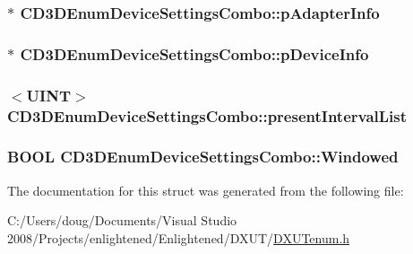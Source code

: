 \label{struct_c_d3_d_enum_device_settings_combo_a55cd4a9f4fe26882fb88ac5f6e97487b}
\hypertarget{struct_c_d3_d_enum_device_settings_combo_aa19ba203763b89e601bca6b9b63c4664}{
\subsubsection[{pAdapterInfo}]{$\ast$ {\bf CD3DEnumDeviceSettingsCombo::pAdapterInfo}}}
\label{struct_c_d3_d_enum_device_settings_combo_aa19ba203763b89e601bca6b9b63c4664}
\hypertarget{struct_c_d3_d_enum_device_settings_combo_a8d7ac13c75c72aa1f1f43c9b64d2988a}{
\subsubsection[{pDeviceInfo}]{$\ast$ {\bf CD3DEnumDeviceSettingsCombo::pDeviceInfo}}}
\label{struct_c_d3_d_enum_device_settings_combo_a8d7ac13c75c72aa1f1f43c9b64d2988a}
\hypertarget{struct_c_d3_d_enum_device_settings_combo_a2837c6202c73f23f560c0a5f641a111f}{
\subsubsection[{presentIntervalList}]{$<$UINT$>$ {\bf CD3DEnumDeviceSettingsCombo::presentIntervalList}}}
\label{struct_c_d3_d_enum_device_settings_combo_a2837c6202c73f23f560c0a5f641a111f}
\hypertarget{struct_c_d3_d_enum_device_settings_combo_a1117df7df25ceaa63f497664f6ba98d1}{
\subsubsection[{Windowed}]{\setlength{\rightskip}{0pt plus 5cm}BOOL {\bf CD3DEnumDeviceSettingsCombo::Windowed}}}
\label{struct_c_d3_d_enum_device_settings_combo_a1117df7df25ceaa63f497664f6ba98d1}


The documentation for this struct was generated from the following file:\begin{DoxyCompactItemize}
\item 
C:/Users/doug/Documents/Visual Studio 2008/Projects/enlightened/Enlightened/DXUT/\hyperlink{_d_x_u_tenum_8h}{DXUTenum.h}\end{DoxyCompactItemize}
